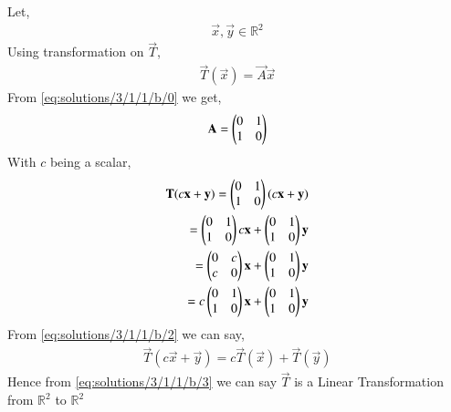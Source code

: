 Let,
\begin{align}
\vec{x}, \vec{y} \in \mathbb{R}^2 
\end{align}
Using transformation on $\vec{T}$, 
\begin{align}
\vec{T}(\vec{x}) =\vec{A}\vec{x} \label{eq:solutions/3/1/1/b/1}
\end{align}
From \eqref{eq:solutions/3/1/1/b/0} we get,
\begin{align}
\mathbf{A}= \begin{pmatrix}0&1\\1&0\end{pmatrix}
\end{align}
With $c$ being a scalar,
\begin{align}
\mathbf{T}(c\mathbf{x}+\mathbf{y}) = \begin{pmatrix}0&1\\1&0\end{pmatrix}(c\mathbf{x}+\mathbf{y})\\
=\begin{pmatrix}0&1\\1&0\end{pmatrix}c\mathbf{x}+\begin{pmatrix}0&1\\1&0\end{pmatrix}\mathbf{y}\\
=\begin{pmatrix}0&c\\c&0\end{pmatrix}\mathbf{x}+\begin{pmatrix}0&1\\1&0\end{pmatrix}\mathbf{y}\\
=c\begin{pmatrix}0&1\\1&0\end{pmatrix}\mathbf{x}+\begin{pmatrix}0&1\\1&0\end{pmatrix}\mathbf{y}\label{eq:solutions/3/1/1/b/2}
\end{align}
From \eqref{eq:solutions/3/1/1/b/2} we can say,
\begin{align}
\vec{T}(c\vec{x}+\vec{y})=c\vec{T}(\vec{x})+\vec{T}(\vec{y})\label{eq:solutions/3/1/1/b/3}
\end{align}
Hence from \eqref{eq:solutions/3/1/1/b/3} we can say $\vec{T}$ is a Linear Transformation from $\mathbb{R}^2$ to $\mathbb{R}^2$ 
